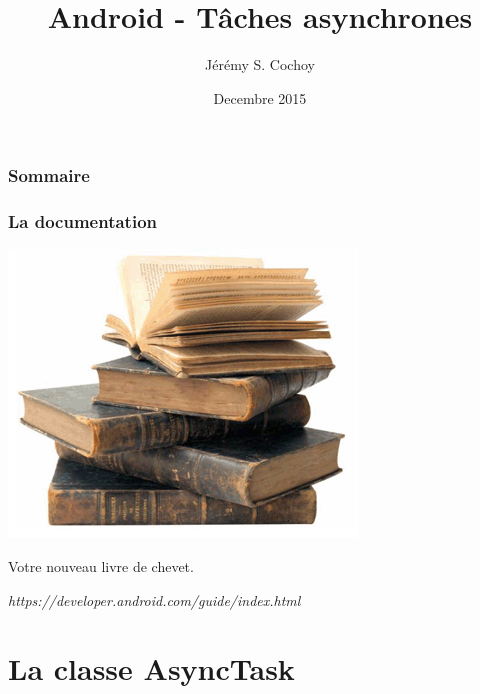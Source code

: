 \documentclass{beamer}
\begin{document}
\title{Android - Tâches asynchrones}
\author{Jérémy S. Cochoy}
\date{Decembre 2015}


\begin{frame}
\titlepage
\end{frame}

\begin{frame}
\frametitle{Sommaire}
\tableofcontents
\end{frame}

\begin{frame}
\frametitle{La documentation}
\begin{center}
\includegraphics[scale=0.5]{livres.png}
\end{center}
\begin{block}{Votre nouveau livre de chevet.}
\begin{center}
\emph{https://developer.android.com/guide/index.html}
\end{center}
\end{block}

\end{frame}

\section{La classe AsyncTask}
\end{document}
